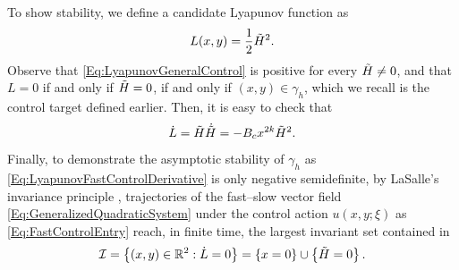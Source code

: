 \documentclass[3p]{elsarticle}
\theoremstyle{plain}
\theoremstyle{remark}
\theoremstyle{definition}
\begin{document}
        To show stability, we define a candidate Lyapunov function as
        \begin{equation}
            L(x, y) = \frac{1}{2}\Tilde{H}^{2}.
            \label{Eq:LyapunovGeneralControl}
        \end{equation}
            Observe that \eqref{Eq:LyapunovGeneralControl} is positive for every $\Tilde{H}\neq 0$, and that $L=0$ if and only if $\Tilde{H}=0$, if and only if $(x, y)\in \gamma_{h}$, which we recall is the control target defined earlier. Then, it is easy to check that
        \begin{equation}
            \dot{L} = \Tilde{H} \dot{\Tilde{H}} = -B_{c}x^{2k}\Tilde{H}^{2}.
            \label{Eq:LyapunovFastControlDerivative}
        \end{equation}
        Finally, to demonstrate the asymptotic stability of $\gamma_{h}$ as \eqref{Eq:LyapunovFastControlDerivative} is only negative semidefinite, by LaSalle's invariance principle \cite{Ref:Lasalle1960}, trajectories of the fast--slow vector field \eqref{Eq:GeneralizedQuadraticSystem} under the control action $u(x,y;\xi)$ as \eqref{Eq:FastControlEntry} reach, in finite time, the largest invariant set contained in
        \begin{equation}
            \mathcal{I} = \left\{ (x, y)\in \mathbb{R}^{2}:\dot{L} = 0 \right\} = \{ x=0 \} \cup \left\{ \Tilde{H} = 0 \right\}.
            \label{Eq:LyapunovInvariantSet}
        \end{equation}
\end{document}
